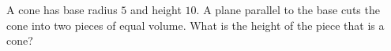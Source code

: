 A cone has base radius $5$ and height $10$. A plane parallel to the base cuts the cone into two pieces of equal volume. What is the height of the piece that is a cone?
